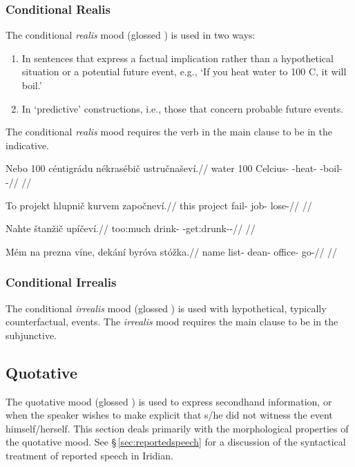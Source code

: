 \subsubsection{Conditional Realis}

\par The conditional \textit{realis} mood (glossed ) is used in two ways:
\begin{enumerate}
	\item In sentences that express a factual implication rather than a hypothetical situation or a potential future event, e.g., `If you heat water to 100 C, it will boil.'
	\item In `predictive' constructions, i.e., those that concern probable future events.
\end{enumerate}

The conditional \emph{realis} mood requires the verb in the main clause to be in the indicative.


\pex
\begingl
\gla Nebo 100 céntigrádu nékrasébič ustručnaševí.//
\glb water 100 Celcius-\Ins{} \Caus{}-heat- \Refl{}-boil-\Av{}-\Cont{}//
\glft {}//
\endgl
\xe

\pex
\begingl
\gla To projekt hlupnič kurvem započneví.//
\glb this project fail- job-\First{}\Sg{} lose-//
\glft {}//
\endgl
\xe

\pex
\begingl
\gla Nahte štanžič upíčeví.//
\glb too:much drink- \Refl{}-get:drunk-\Av{}-\Cont{}//
\glft {}//
\endgl
\xe

\pex
\begingl
\gla Mém na prezna víne, dekání byróva stóžka.//
\glb name \Loc{} list-\Pat{}  dean-\Gen{} office-\Pat{} go-//
\glft {}//
\endgl
\xe

\subsubsection{Conditional Irrealis}
The conditional \textit{irrealis} mood (glossed ) is used with hypothetical, typically counterfactual, events. The \emph{irrealis} mood requires the main clause to be in the subjunctive.

\subsection{Quotative}\label{sec:quotative}
\par The quotative mood (glossed ) is used to express secondhand information, or when the speaker wishes to make explicit that s/he did not witness the event himself/herself. This section deals primarily with the morphological properties of the quotative mood. See \S\,\ref{sec:reportedspeech} for a discussion of the syntactical treatment of reported speech in Iridian.

